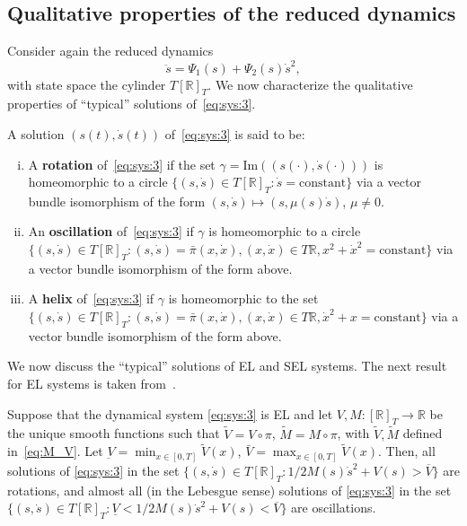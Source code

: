 \subsection{Qualitative properties of the reduced dynamics}
\label{sec:qualitative_properties}

Consider again the reduced dynamics
\begin{equation}\label{eq:sys:3}
\ddot s = \Psi_1 (s) + \Psi_2(s) \dot s^2,
\end{equation}
with state space the cylinder $T[\mathbb{R}]_T$. We now characterize the
qualitative properties of ``typical'' solutions of~\eqref{eq:sys:3}.
\begin{definition}\label{defn:solution_types}
	A solution $(s(t),\dot s(t))$ of~\eqref{eq:sys:3} is said to be:
				\begin{enumerate}[(i)]
		\item A {\bf rotation} of~\eqref{eq:sys:3} if the set $\gamma =
		\text{Im}((s(\cdot),\dot s(\cdot)))$ is homeomorphic to a circle
		$\{(s,\dot s) \in T [\mathbb{R}]_T : \dot s = \text{constant}\}$ via a vector
		bundle isomorphism of the form $(s,\dot s) \mapsto (s,\mu(s) \dot
		s)$, $\mu \neq 0$.
		
		\item An {\bf oscillation} of~\eqref{eq:sys:3} if $\gamma$ is
		homeomorphic to a circle $\{(s,\dot s) \in T [\mathbb{R}]_T: (s,\dot s) =
		\bar{\pi}(x,\dot x), (x,\dot x) \in T\mathbb{R}, x^2+\dot x^2=\text{constant}\}$
		via a vector bundle isomorphism of the form above.
		
		\item A {\bf helix} of~\eqref{eq:sys:3} if $\gamma$ is homeomorphic to
		the set $\{(s,\dot s) \in T [\mathbb{R}]_T: (s,\dot s) = \bar{\pi}(x,\dot x),
		(x,\dot x) \in T\mathbb{R},\dot x^2 + x=\text{constant}\}$ via a vector
		bundle isomorphism of the form above.
		
	\end{enumerate}
			\end{definition}
We now discuss the ``typical'' solutions of EL and SEL systems. The
next result for EL systems is taken
from~\cite[Proposition~4.7]{Maggiore-2012}.
\begin{proposition} \label{prop:EL:qualitative} 
	Suppose that the dynamical system \eqref{eq:sys:3} is EL and let $V, M
	: [\mathbb{R}]_T \to \mathbb{R}$ be the unique smooth functions such that $\tilde V = V
	\circ \pi$, $\tilde M = M \circ \pi$, with $\tilde V,\tilde M$ defined
	in~\eqref{eq:M_V}. Let $\underbar{V} = \min_{x \in [0,T]} \tilde
	V(x)$, $\bar V = \max_{x \in [0,T]} \tilde V(x)$.  Then, all solutions
	of \eqref{eq:sys:3} in the set $\{(s,\dot{s})\in T[\mathbb{R}]_T:
	1/2M(s)\dot{s}^2 + V(s)> \overline{V}\}$ are rotations, and almost all
	(in the Lebesgue sense) solutions of \eqref{eq:sys:3} in the set
	$\{(s,\dot{s})\in T [\mathbb{R}]_T: \underline{V}<1/2M(s)\dot{s}^2 +
	V(s)<\overline{V}\}$ are oscillations.
\end{proposition}

